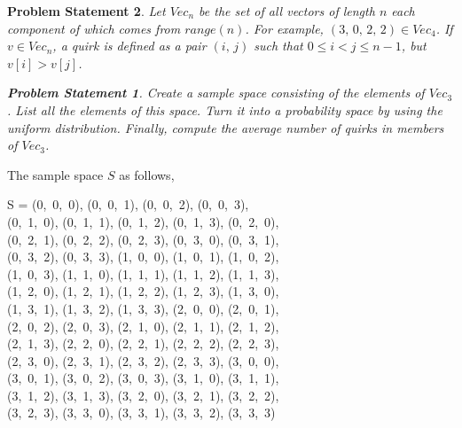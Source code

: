 \documentclass[12pt,listof=totoc,toc=sectionentrywithdots]{scrartcl}
\newtheorem*{statement}{Problem Statement}
\begin{document}
\problem{}
\begin{statement}
Let $Vec_n$ be the set of all vectors of length $n$ each component of which comes from $range(n)$. For example, $(3,\, 0,\, 2,\, 2) \in Vec_4$. If $v \in Vec_n$, a \textit{quirk} is defined as a pair $(i,\, j)$ such that $0 \leq  i <  j \leq  n - 1$, but $v[i] > v[j]$.

\subproblem{}
\begin{statement}
    Create a sample space consisting of the elements of $Vec_3$. List all the elements of this space. Turn it into a probability space by using the uniform distribution. Finally, compute the average number of quirks in members of $Vec_3$.
\end{statement}

\end{statement}

The sample space $S$ as follows,

\begin{center}
    \begin{multiline}
        S = (0,\, 0,\, 0),
        (0,\, 0,\, 1),
        (0,\, 0,\, 2),
        (0,\, 0,\, 3), \\
        (0,\, 1,\, 0),
        (0,\, 1,\, 1),
        (0,\, 1,\, 2),
        (0,\, 1,\, 3),
        (0,\, 2,\, 0), \\
        (0,\, 2,\, 1),
        (0,\, 2,\, 2),
        (0,\, 2,\, 3),
        (0,\, 3,\, 0),
        (0,\, 3,\, 1), \\
        (0,\, 3,\, 2),
        (0,\, 3,\, 3),
        (1,\, 0,\, 0),
        (1,\, 0,\, 1),
        (1,\, 0,\, 2), \\
        (1,\, 0,\, 3),
        (1,\, 1,\, 0),
        (1,\, 1,\, 1),
        (1,\, 1,\, 2),
        (1,\, 1,\, 3), \\
        (1,\, 2,\, 0),
        (1,\, 2,\, 1),
        (1,\, 2,\, 2),
        (1,\, 2,\, 3),
        (1,\, 3,\, 0), \\
        (1,\, 3,\, 1),
        (1,\, 3,\, 2),
        (1,\, 3,\, 3),
        (2,\, 0,\, 0),
        (2,\, 0,\, 1), \\
        (2,\, 0,\, 2),
        (2,\, 0,\, 3),
        (2,\, 1,\, 0),
        (2,\, 1,\, 1),
        (2,\, 1,\, 2), \\
        (2,\, 1,\, 3),
        (2,\, 2,\, 0),
        (2,\, 2,\, 1),
        (2,\, 2,\, 2),
        (2,\, 2,\, 3), \\
        (2,\, 3,\, 0),
        (2,\, 3,\, 1),
        (2,\, 3,\, 2),
        (2,\, 3,\, 3),
        (3,\, 0,\, 0), \\
        (3,\, 0,\, 1),
        (3,\, 0,\, 2),
        (3,\, 0,\, 3),
        (3,\, 1,\, 0),
        (3,\, 1,\, 1), \\
        (3,\, 1,\, 2),
        (3,\, 1,\, 3),
        (3,\, 2,\, 0),
        (3,\, 2,\, 1),
        (3,\, 2,\, 2), \\
        (3,\, 2,\, 3),
        (3,\, 3,\, 0),
        (3,\, 3,\, 1),
        (3,\, 3,\, 2),
        (3,\, 3,\, 3)
    \end{multiline}
\end{center}
\end{document}
